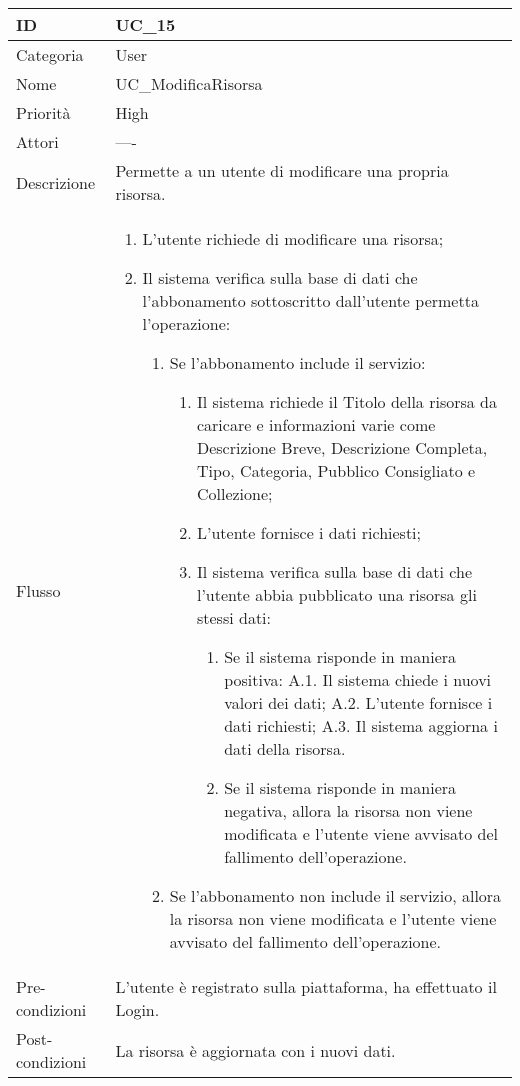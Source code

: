 \begin{center}
\begin{tabular}{ |p{2cm}|p{13cm}|  }
\hline
ID & UC\_15 \\\hline
Categoria & User\\\hline
Nome & UC\_ModificaRisorsa\\\hline
Priorità & High \\\hline
Attori &  ---- \\\hline
Descrizione & Permette a un utente di modificare una propria risorsa.\\\hline
Flusso &  	\begin{enumerate}
			\item L'utente richiede di modificare una risorsa;
			\item Il sistema verifica sulla base di dati che l'abbonamento sottoscritto dall'utente permetta l'operazione:
			\begin{enumerate}
				\item Se l'abbonamento include il servizio:
				\begin{enumerate}
					\item Il sistema richiede il Titolo della risorsa da caricare e informazioni varie come Descrizione Breve,  Descrizione Completa, Tipo, Categoria, Pubblico Consigliato e Collezione;
					\item L'utente fornisce i dati richiesti;
					\item Il sistema verifica sulla base di dati che l'utente abbia pubblicato una risorsa gli stessi dati:
					\begin{enumerate}
						\item Se il sistema risponde in maniera positiva:
							\subitem A.1. Il sistema chiede i nuovi valori dei dati;
							\subitem A.2. L'utente fornisce i dati richiesti;
							\subitem A.3. Il sistema aggiorna i dati della risorsa.
						\item Se il sistema risponde in maniera negativa, allora  la risorsa non viene modificata e l'utente viene avvisato del fallimento dell'operazione.
					\end{enumerate}
				\end{enumerate}
				\item Se l'abbonamento non include il servizio, allora la risorsa non viene modificata e l'utente viene avvisato del fallimento dell'operazione.
			\end{enumerate}
		\end{enumerate}\\\hline
Pre-condizioni & L'utente è registrato sulla piattaforma, ha effettuato il Login.\\\hline
Post-condizioni & La risorsa è aggiornata con i nuovi dati.\\\hline
\end{tabular}
\label{table_use_case:15}\newline


\end{center}
